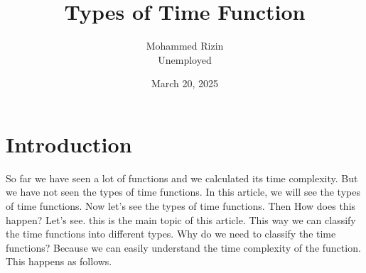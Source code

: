 \documentclass[twocolumn]{article}
\title{Types of Time Function}
\author{Mohammed Rizin \\ Unemployed}
\date{March 20, 2025}
\begin{document}
\maketitle

\section{Introduction}
So far we have seen a lot of functions and we calculated its time complexity. But we have not seen the types of time functions. In this article, we will see the types of time functions. 
Now let's see the types of time functions.
Then How does this happen? Let's see. this is the main topic of this article.
This way we can classify the time functions into different types. Why do we need to classify the time functions? Because we can easily understand the time complexity of the function.
This happens as follows.
\end{document}
